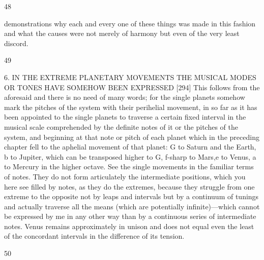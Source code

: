 \documentclass{article}
\begin{document}
48

demonstrations why each and every one of these things was made in this
fashion and what the causes were not merely of harmony but even of the
very least discord.


49

6. IN THE EXTREME PLANETARY MOVEMENTS
THE MUSICAL MODES OR TONES HAVE
SOMEHOW BEEN EXPRESSED
[294] This follows from the aforesaid and there is no need of many
words; for the single planets somehow mark the pitches of the system
with their perihelial movement, in so far as it has been appointed to the
single planets to traverse a certain fixed interval in the musical scale
comprehended by the definite notes of it or the pitches of the system,
and beginning at that note or pitch of each planet which in the preceding
chapter fell to the aphelial movement of that planet: G to Saturn and the
Earth, b to Jupiter, which can be transposed higher to G, f-sharp to
Mars,e to Venus, a to Mercury in the higher octave. See the single
movements in the familiar terms of notes. They do not form articulately
the intermediate positions, which you here see filled by notes, as they do
the extremes, because they struggle from one extreme to the opposite not
by leaps and intervals but by a continuum of tunings and actually
traverse all the means (which are potentially infinite)—which cannot be
expressed by me in any other way than by a continuous series of
intermediate notes. Venus remains approximately in unison and does
not equal even the least of the concordant intervals in the difference of
its tension.


50
\end{document}
